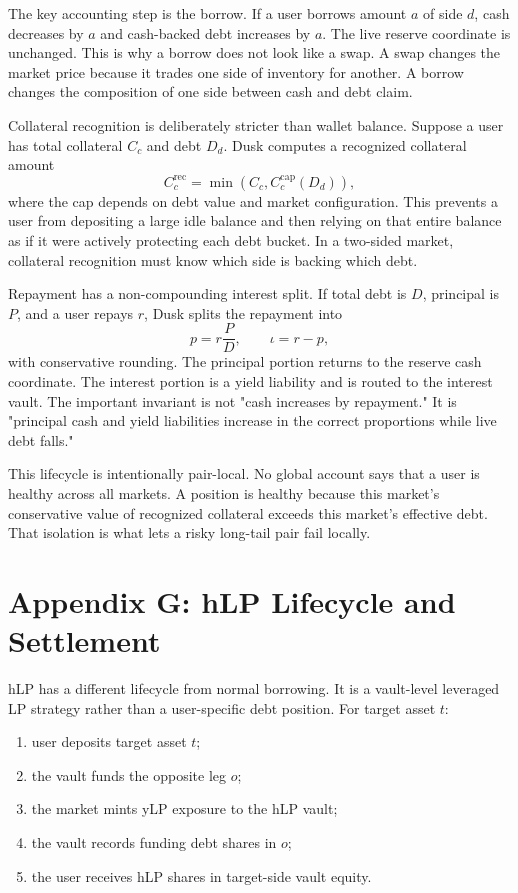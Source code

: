 \documentclass[11pt]{article}
\begin{document}
The key accounting step is the borrow. If a user borrows amount $a$ of side $d$, cash decreases by $a$ and cash-backed debt increases by $a$. The live reserve coordinate is unchanged. This is why a borrow does not look like a swap. A swap changes the market price because it trades one side of inventory for another. A borrow changes the composition of one side between cash and debt claim.

Collateral recognition is deliberately stricter than wallet balance. Suppose a user has total collateral $C_c$ and debt $D_d$. Dusk computes a recognized collateral amount
\begin{equation}
C_c^{\mathrm{rec}}=\min(C_c,C_c^{\mathrm{cap}}(D_d)),
\end{equation}
where the cap depends on debt value and market configuration. This prevents a user from depositing a large idle balance and then relying on that entire balance as if it were actively protecting each debt bucket. In a two-sided market, collateral recognition must know which side is backing which debt.

Repayment has a non-compounding interest split. If total debt is $D$, principal is $P$, and a user repays $r$, Dusk splits the repayment into
\begin{equation}
p=r\frac{P}{D},\qquad \iota=r-p,
\end{equation}
with conservative rounding. The principal portion returns to the reserve cash coordinate. The interest portion is a yield liability and is routed to the interest vault. The important invariant is not "cash increases by repayment." It is "principal cash and yield liabilities increase in the correct proportions while live debt falls."

This lifecycle is intentionally pair-local. No global account says that a user is healthy across all markets. A position is healthy because this market's conservative value of recognized collateral exceeds this market's effective debt. That isolation is what lets a risky long-tail pair fail locally.

\section{Appendix G: hLP Lifecycle and Settlement}

hLP has a different lifecycle from normal borrowing. It is a vault-level leveraged LP strategy rather than a user-specific debt position. For target asset $t$:
\begin{enumerate}
  \item user deposits target asset $t$;
  \item the vault funds the opposite leg $o$;
  \item the market mints yLP exposure to the hLP vault;
  \item the vault records funding debt shares in $o$;
  \item the user receives hLP shares in target-side vault equity.
\end{enumerate}
\end{document}
